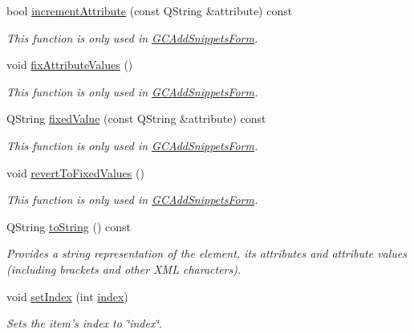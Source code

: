 \begin{DoxyCompactItemize}
bool \hyperlink{class_g_c_tree_widget_item_af0b5f0f5449f402c90e5ab7ff74acc77}{increment\-Attribute} (const \-Q\-String \&attribute) const 
\begin{DoxyCompactList}\small\item\em \-This function is only used in \hyperlink{class_g_c_add_snippets_form}{\-G\-C\-Add\-Snippets\-Form}. \end{DoxyCompactList}\item 
void \hyperlink{class_g_c_tree_widget_item_ada99ae07bebffd9714be294cdd3d920b}{fix\-Attribute\-Values} ()
\begin{DoxyCompactList}\small\item\em \-This function is only used in \hyperlink{class_g_c_add_snippets_form}{\-G\-C\-Add\-Snippets\-Form}. \end{DoxyCompactList}\item 
\-Q\-String \hyperlink{class_g_c_tree_widget_item_a62a31fad1e50915f6df144e23394abef}{fixed\-Value} (const \-Q\-String \&attribute) const 
\begin{DoxyCompactList}\small\item\em \-This function is only used in \hyperlink{class_g_c_add_snippets_form}{\-G\-C\-Add\-Snippets\-Form}. \end{DoxyCompactList}\item 
void \hyperlink{class_g_c_tree_widget_item_ab9be6bb99410543a6238c9ad48f2a9f7}{revert\-To\-Fixed\-Values} ()
\begin{DoxyCompactList}\small\item\em \-This function is only used in \hyperlink{class_g_c_add_snippets_form}{\-G\-C\-Add\-Snippets\-Form}. \end{DoxyCompactList}\item 
\-Q\-String \hyperlink{class_g_c_tree_widget_item_acbd4573d56cc5c6d9bd58c461b797115}{to\-String} () const 
\begin{DoxyCompactList}\small\item\em \-Provides a string representation of the element, its attributes and attribute values (including brackets and other \-X\-M\-L characters). \end{DoxyCompactList}\item 
void \hyperlink{class_g_c_tree_widget_item_af1f6be4d3badc00db1f92de2e7deb71f}{set\-Index} (int \hyperlink{class_g_c_tree_widget_item_af6b48ae274cc4989811ef44944c8ad76}{index})
\begin{DoxyCompactList}\small\item\em \-Sets the item's index to \char`\"{}index\char`\"{}. \end{DoxyCompactList}\item 

\end{DoxyCompactItemize}
